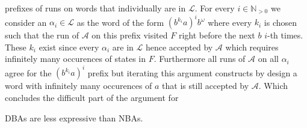 prefixes of runs on words that individually are in $\mathcal{L}$. For every
$i\in\mathbb{N}_{>0}$ we consider an $\alpha_{i}\in\mathcal{L}$ as the word of
the form $(b^{k_{i}}a)^{i}b^{\omega}$ where every $k_{i}$ is chosen such that
the run of $\mathcal{A}$ on this prefix visited $F$ right before the next $b$
$i$-th times. These $k_{i}$ exist since every $\alpha_{i}$ are in $\mathcal{L}$
hence accepted by $\mathcal{A}$ which requires infinitely many occurences of
states in $F$. Furthermore all runs of $\mathcal{A}$ on all $\alpha_{i}$ agree
for the $(b^{k_{i}}a)^{i}$ prefix but iterating this argument constructs by
design a word with infinitely many occurences of $a$ that is still accepted by
$\mathcal{A}$. Which concludes the difficult part of the argument for
\begin{proposition}
  \acp{DBA} are less expressive than \acp{NBA}.
  \label{prop:dba<nba}
\end{proposition}

